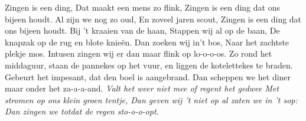 \beginchorus
Zingen is een ding,
Dat maakt een mens zo flink,
Zingen is een ding dat ons bijeen houdt.
Al zijn we nog zo oud,
En zoveel jaren scout,
Zingen is een ding dat ons bijeen houdt. 
\endchorus
\beginverse*
Bij 't kraaien van de haan,
Stappen wij al op de baan,
De knapzak op de rug en blote knieën.
Dan zoeken wij in’t bos,
Naar het zachtste plekje mos. 
Intusen zingen wij er dan maar flink op lo-o-o-os. 
\endverse
\beginverse*
Zo rond het middaguur,
staan de pannekes op het vuur,
en liggen de kotelettekes te braden.
Gebeurt het impesant,
dat den boel is aangebrand.
Dan scheppen we het diner maar onder het za-a-a-and.
\endverse
\beginverse*
\textit{Valt het weer niet mee of regent het gedwee
Met stromen op ons klein groen tentje,
Dan geven wij 't niet op al zaten we in 't sop:
Dan zingen we totdat de regen sto-o-o-opt.}
\endverse
\endsong